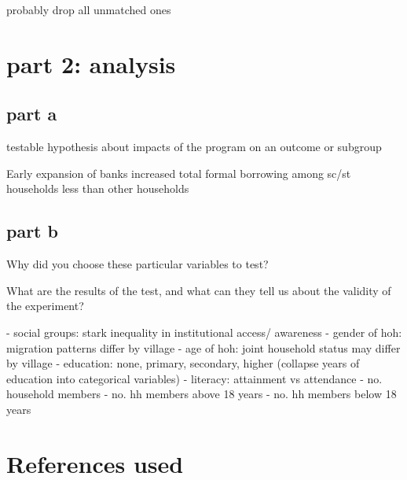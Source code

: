\documentclass[12pt]{article}
\begin{document}
probably drop all unmatched ones


\section{part 2: analysis}

\subsection{part a}

testable hypothesis about impacts of the program on an outcome or subgroup

Early expansion of banks increased total formal borrowing among sc/st households less than other households

\subsection{part b}

Why did you choose these particular variables to test?

What are the results of the test, and what can they tell us about the validity of the
experiment?


- social groups: stark inequality in institutional access/ awareness
- gender of hoh: migration patterns differ by village
- age of hoh: joint household status may differ by village
- education: none, primary, secondary, higher (collapse years of education into categorical variables)
- literacy: attainment vs attendance
- no. household members
- no. hh members above 18 years
- no. hh members below 18 years

\section{References used}
\end{document}
